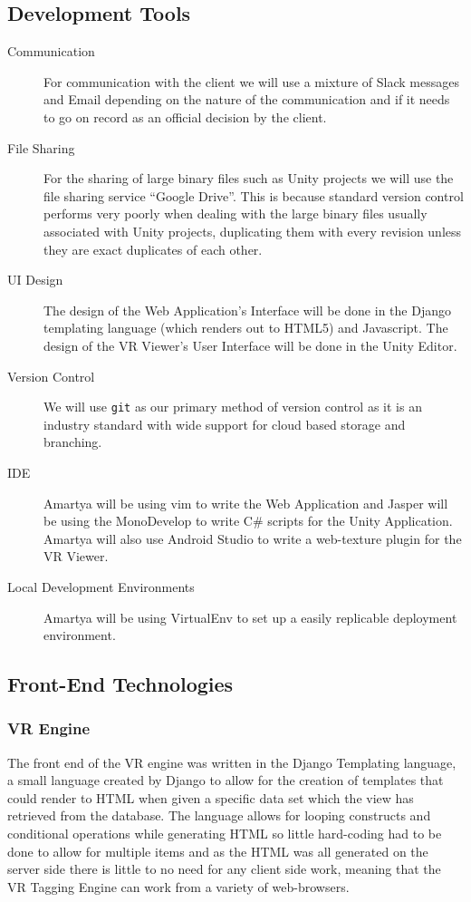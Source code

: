 \documentclass[12pt]{report}
\newcommand{\inlinecode}{\texttt}
\begin{document}
\subsection{Development Tools}
\begin{description}
    \item[Communication] For communication with the client we will use a
        mixture of Slack messages and Email depending on the nature of the
        communication and if it needs to go on record as an official decision
        by the client.
    \item[File Sharing] For the sharing of large binary files such as Unity
        projects we will use the file sharing service ``Google Drive''. This is
        because standard version control performs very poorly when dealing with
        the large binary files usually associated with Unity projects,
        duplicating them with every revision unless they are exact duplicates
        of each other.
    \item[UI Design] The design of the Web Application's Interface will be done
        in the Django templating language (which renders out to HTML5) and
        Javascript. The design of the VR Viewer's User Interface will be done
        in the Unity Editor.
    \item[Version Control] We will use \inlinecode{git} as our primary method
        of version control as it is an industry standard with wide support for
        cloud based storage and branching.
    \item[IDE] Amartya will be using vim to write the Web Application and
        Jasper will be using the MonoDevelop to write C\# scripts for the Unity
        Application. Amartya will also use Android Studio to write a
        web-texture plugin for the VR Viewer.
    \item[Local Development Environments] Amartya will be using VirtualEnv to
        set up a easily replicable deployment environment.
\end{description}

\subsection{Front-End Technologies}
\subsubsection{VR Engine}
The front end of the VR engine was written in the Django Templating language, a
small language created by Django to allow for the creation of templates that
could render to HTML when given a specific data set which the view has
retrieved from the database. The language allows for looping constructs and
conditional operations while generating HTML so little hard-coding had to be
done to allow for multiple items and as the HTML was all generated on the
server side there is little to no need for any client side work, meaning that
the VR Tagging Engine can work from a variety of web-browsers.
\end{document}
